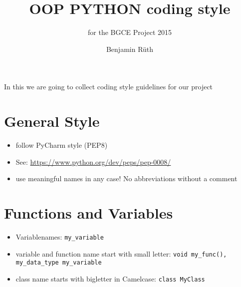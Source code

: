 \documentclass[10pt,a4paper]{scrartcl}
\title{OOP PYTHON coding style}
\author{Benjamin Rüth}
\subtitle{for the BGCE Project 2015}
\begin{document}
\maketitle
In this we are going to collect coding style guidelines for our project

\section{General Style}
\begin{itemize}
\item follow PyCharm style (PEP8)
\item See: \url{https://www.python.org/dev/peps/pep-0008/}
\item use meaningful names in any case! No abbreviations without a comment
\end{itemize}

\section{Functions and Variables}
\begin{itemize}
\item Variablenames: \verb+my_variable+
\item variable and function name start with small letter: \texttt{void my\_func(), my\_data\_type my\_variable}
\item class name starts with bigletter in Camelcase: \texttt{class MyClass}
\end{itemize}
\end{document}
